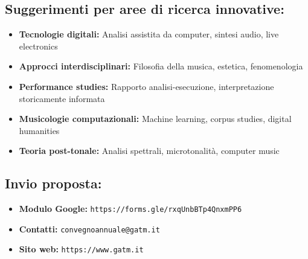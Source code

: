 \documentclass[12pt,a4paper]{article}
\begin{document}
\subsection*{Suggerimenti per aree di ricerca innovative:}
\begin{itemize}
    \item \textbf{Tecnologie digitali:} Analisi assistita da computer, sintesi audio, live electronics
    \item \textbf{Approcci interdisciplinari:} Filosofia della musica, estetica, fenomenologia
    \item \textbf{Performance studies:} Rapporto analisi-esecuzione, interpretazione storicamente informata
    \item \textbf{Musicologie computazionali:} Machine learning, corpus studies, digital humanities
    \item \textbf{Teoria post-tonale:} Analisi spettrali, microtonalità, computer music
\end{itemize}

\subsection*{Invio proposta:}
\begin{itemize}
    \item \textbf{Modulo Google:} \texttt{https://forms.gle/rxqUnbBTp4QnxmPP6}
    \item \textbf{Contatti:} \texttt{convegnoannuale@gatm.it}
    \item \textbf{Sito web:} \texttt{https://www.gatm.it}
\end{itemize}
\end{document}
